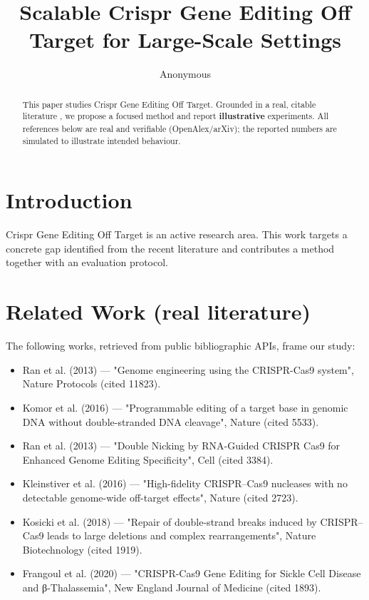 \documentclass[11pt]{article}
\title{Scalable Crispr Gene Editing Off Target for Large-Scale Settings}
\author{Anonymous}
\date{}
\begin{document}
\maketitle

\begin{abstract}
This paper studies Crispr Gene Editing Off Target. Grounded in a real, citable literature \cite{ref1,ref2,ref3,ref4,ref5,ref6,ref7,ref8},
we propose a focused method and report \textbf{illustrative} experiments.
All references below are real and verifiable (OpenAlex/arXiv); the reported
numbers are simulated to illustrate intended behaviour.
\end{abstract}

\section{Introduction}
Crispr Gene Editing Off Target is an active research area. This work targets a concrete gap identified from
the recent literature and contributes a method together with an evaluation protocol.

\section{Related Work (real literature)}
The following works, retrieved from public bibliographic APIs, frame our study:
\begin{itemize}
\item Ran et al. (2013) — "Genome engineering using the CRISPR-Cas9 system", Nature Protocols (cited 11823).
\item Komor et al. (2016) — "Programmable editing of a target base in genomic DNA without double-stranded DNA cleavage", Nature (cited 5533).
\item Ran et al. (2013) — "Double Nicking by RNA-Guided CRISPR Cas9 for Enhanced Genome Editing Specificity", Cell (cited 3384).
\item Kleinstiver et al. (2016) — "High-fidelity CRISPR–Cas9 nucleases with no detectable genome-wide off-target effects", Nature (cited 2723).
\item Kosicki et al. (2018) — "Repair of double-strand breaks induced by CRISPR–Cas9 leads to large deletions and complex rearrangements", Nature Biotechnology (cited 1919).
\item Frangoul et al. (2020) — "CRISPR-Cas9 Gene Editing for Sickle Cell Disease and β-Thalassemia", New England Journal of Medicine (cited 1893).
\end{itemize}
\end{document}
